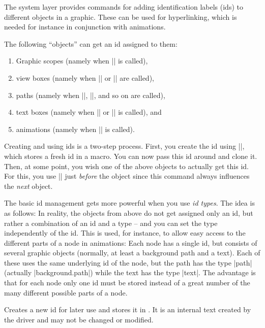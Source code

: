 The system layer provides commands for adding identification labels
(ids) to different objects in a graphic. These can be used for
hyperlinking, which is needed for instance in conjunction with
animations.

The following ``objects'' can get an id assigned to them:
\begin{enumerate}
\item Graphic scopes (namely when |\pgfsys@begin@idscope| is called),
\item view boxes (namely when |\pgfsys@viewboxmeet| or |\pgfsys@viewboxslice| are called),
\item paths (namely when |\pgfsys@fill|, |\pgfsys@stroke|, and so on are called),
\item text boxes (namely when |\pgfsys@hbox| or |\pgfsys@hboxsynced| is called), and
\item animations (namely when |\pgfsys@animate| is called).
\end{enumerate}


Creating and using ids is a two-step process. First, you create the
id using |\pgfsys@new@id|, which stores a fresh id in a macro. You can
now pass this id around and clone it. Then, at some point, you wish
one of the above objects to actually get this id. For this, you use
|\pgfsys@use@id| just \emph{before} the object since this command
always influences the \emph{next} object.

The basic id management gets more powerful when you use \emph{id
  types}. The idea is as follows: In reality, the objects from above
do not get assigned only an id, but rather a combination of an id and
a type -- and you can set the type independently of the id. This is
used, for instance, to allow easy access to the different parts of a
node in animations: Each node has a single id, but consists of several
graphic objects (normally, at least a background path and a
text). Each of these uses the same underlying id of the node, but the
path has the type |path| (actually |background.path|) while the text
has the type |text|. The advantage is that for each node only one id
must be stored instead of a great number of the many different
possible parts of a node.

\begin{command}{\pgfsys@new@id{}}
  Creates a new id for later use and stores it in . It is
  an internal text created by the driver and may not be changed or
  modified. 
\end{command}

